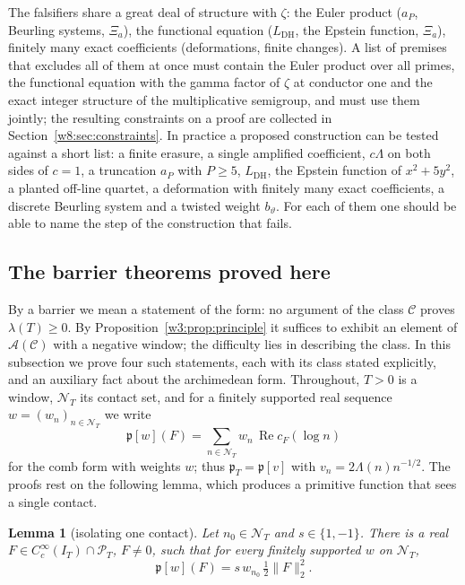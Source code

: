 \documentclass[11pt]{amsart}
\newtheorem{lemma}[theorem]{Lemma}
\theoremstyle{definition}
\theoremstyle{remark}
\numberwithin{equation}{section}
\DeclareMathOperator{\Rel}{Re}
\newcommand{\IT}{I_T}                                  %
\newcommand{\cF}{c_F}                                  %
\newcommand{\PT}{\mathcal{P}_T}                        %
\newcommand{\NT}{\mathcal{N}_T}                        %
\newcommand{\pT}{\mathfrak{p}_T}                       %
\newcommand{\lam}{\lambda(T)}                          %
\begin{document}
The falsifiers share a great deal of structure with $\zeta$: the Euler product ($a_P$, Beurling systems,
$\Xi_a$), the functional equation ($L_{\mathrm{DH}}$, the Epstein function, $\Xi_a$), finitely many exact
coefficients (deformations, finite changes). A list of premises that excludes all of them at once must contain the
Euler product over all primes, the functional equation with the gamma factor of $\zeta$ at conductor one and the
exact integer structure of the multiplicative semigroup, and must use them jointly; the resulting constraints on a
proof are collected in Section~\ref{w8:sec:constraints}. In practice a proposed construction can be tested against a
short list: a finite erasure, a single amplified coefficient, $c\Lambda$ on both sides of $c=1$, a truncation $a_P$
with $P\ge5$, $L_{\mathrm{DH}}$, the Epstein function of $x^2+5y^2$, a planted off-line quartet, a deformation with
finitely many exact coefficients, a discrete Beurling system and a twisted weight $b_\vartheta$. For each of them
one should be able to name the step of the construction that fails.

\subsection{The barrier theorems proved here}
\label{w3:sec:barriers}\label{w3:subsec:lemmas}\label{w3:subsec:proved}

By a barrier we mean a statement of the form: no argument of the class $\mathcal C$ proves $\lam\ge0$. By
Proposition~\ref{w3:prop:principle} it suffices to exhibit an element of $\mathcal A(\mathcal C)$ with a negative
window; the difficulty lies in describing the class. In this subsection we prove four such statements, each with
its class stated explicitly, and an auxiliary fact about the archimedean form. Throughout, $T>0$ is a window,
$\NT$ its contact set, and for a finitely supported real sequence $w=(w_n)_{n\in\NT}$ we write
\[
  \mathfrak p[w](F)=\sum_{n\in\NT}w_n\,\Rel\cF(\log n)
\]
for the comb form with weights $w$; thus $\pT=\mathfrak p[v]$ with $v_n=2\Lambda(n)n^{-1/2}$. The proofs rest on
the following lemma, which produces a primitive function that sees a single contact.

\begin{lemma}[isolating one contact]\label{w3:lem:isolate}
Let $n_0\in\NT$ and $s\in\{1,-1\}$. There is a real $F\in C_c^\infty(\IT)\cap\PT$, $F\ne0$, such that for every
finitely supported $w$ on $\NT$,
\[
  \mathfrak p[w](F)=s\,w_{n_0}\,\tfrac12\|F\|_2^2 .
\]
\end{lemma}
\end{document}
